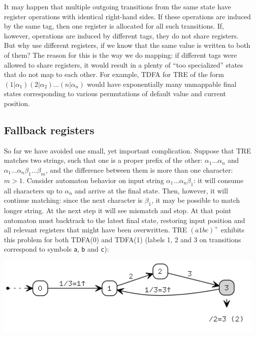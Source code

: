 \documentclass{article}
\newenvironment{Xfig}
    {\par\medskip\noindent\minipage{\linewidth}\begin{center}}
    {\end{center}\endminipage\par\medskip}
\theoremstyle{definition}
\begin{document}
\begin{multicols}{2}
It may happen that multiple outgoing transitions from the same state have register operations with identical right-hand sides.
If these operations are induced by the same tag, then one register is allocated for all such transitions.
If, however, operations are induced by different tags, they do not share registers.
But why use different registers, if we know that the same value is written to both of them?
The reason for this is the way we do mapping: if different tags were allowed to share registers,
it would result in a plenty of ``too specialized'' states that do not map to each other.
For example, TDFA for TRE of the form $(1 | \alpha_1) (2 | \alpha_2) \dots (n | \alpha_n)$
would have exponentially many unmappable final states
corresponding to various permutations of default value and current position.

\subsection*{Fallback registers}

So far we have avoided one small, yet important complication.
Suppose that TRE matches two strings, such that one is a proper prefix of the other:
$\alpha_1 \dots \alpha_n$ and $\alpha_1 \dots \alpha_n \beta_1 \dots \beta_m$,
and the difference between them is more than one character: $m \!>\! 1$.
Consider automaton behavior on input string $\alpha_1 \dots \alpha_n \beta_1$:
it will consume all characters up to $\alpha_n$ and arrive at the final state.
Then, however, it will continue matching: since the next character is $\beta_1$, it may be possible to match longer string.
At the next step it will see mismatch and stop.
At that point automaton must backtrack to the latest final state,
restoring input position and all relevant registers that might have been overwritten.
TRE $(a 1 bc)^+$ exhibits this problem for both TDFA(0) and TDFA(1)
(labels 1, 2 and 3 on transitions correspond to symbols \texttt{a}, \texttt{b} and \texttt{c}):

\begin{Xfig}
\includegraphics[width=\linewidth]{img/fallback/tdfa0.png}
\end{Xfig}


\end{multicols}
\end{document}
